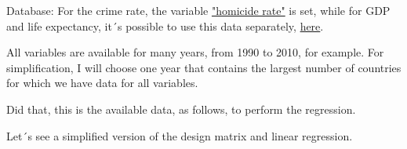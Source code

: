 \documentclass{article} %
\begin{document}
Database: For the crime rate, the variable \href{https://ourworldindata.org/grapher/homicide-rate-unodc}{"homicide rate"} is set, while for GDP and life expectancy, it´s possible to use this data separately, \href{https://ourworldindata.org/grapher/life-expectancy-vs-gdp-per-capita}{here}.


All variables are available for many years, from 1990 to 2010, for example. For simplification, I will choose one year that contains the largest number of countries for which we have data for all variables.


Did that, this is the available data, as follows, to perform the regression.  



Let´s see a simplified version of the design matrix and linear regression.
\end{document}
